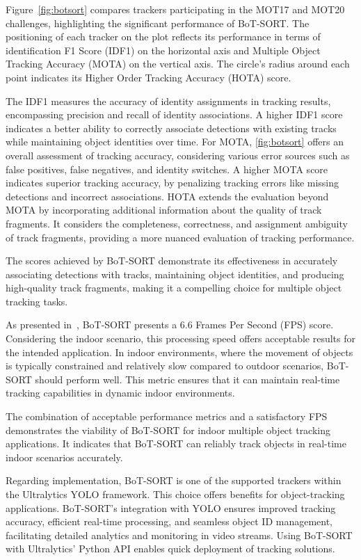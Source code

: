 Figure~\ref{fig:botsort} compares trackers participating in the MOT17 and MOT20 challenges, highlighting the significant performance of BoT-SORT. The positioning of each tracker on the plot reflects its performance in terms of identification F1 Score (IDF1) on the horizontal axis and Multiple Object Tracking Accuracy (MOTA) on the vertical axis.
The circle's radius around each point indicates its Higher Order Tracking Accuracy (HOTA) score.

The IDF1 measures the accuracy of identity assignments in tracking results, encompassing precision and recall of identity associations.
A higher IDF1 score indicates a better ability to correctly associate detections with existing tracks while maintaining object identities over time.
For MOTA, \ref{fig:botsort} offers an overall assessment of tracking accuracy, considering various error sources such as false positives, false negatives, and identity switches.
A higher MOTA score indicates superior tracking accuracy, by penalizing tracking errors like missing detections and incorrect associations.
HOTA extends the evaluation beyond MOTA by incorporating additional information about the quality of track fragments.
 It considers the completeness, correctness, and assignment ambiguity of track fragments, providing a more nuanced evaluation of tracking performance.

The scores achieved by BoT-SORT demonstrate its effectiveness in accurately associating detections with tracks, maintaining object identities, and producing high-quality track fragments, making it a compelling choice for multiple object tracking tasks.

As presented in~\cite{botsort}, BoT-SORT presents a 6.6 Frames Per Second (FPS) score.
Considering the indoor scenario, this processing speed offers acceptable results for the intended application.
In indoor environments, where the movement of objects is typically constrained and relatively slow compared to outdoor scenarios, BoT-SORT should perform well.
This metric ensures that it can maintain real-time tracking capabilities in dynamic indoor environments.

The combination of acceptable performance metrics and a satisfactory FPS demonstrates the viability of BoT-SORT for indoor multiple object tracking applications.
It indicates that BoT-SORT can reliably track objects in real-time indoor scenarios accurately.

Regarding implementation, BoT-SORT is one of the supported trackers within the Ultralytics YOLO framework.
This choice offers benefits for object-tracking applications.
BoT-SORT's integration with YOLO ensures improved tracking accuracy, efficient real-time processing, and seamless object ID management, facilitating detailed analytics and monitoring in video streams.
Using BoT-SORT with Ultralytics' Python API enables quick deployment of tracking solutions.


